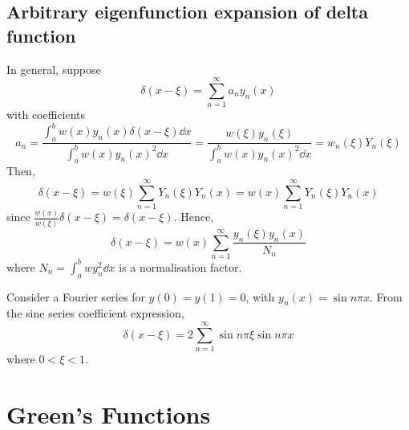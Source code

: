 \documentclass[a4paper]{article}
\begin{document}
\subsection{Arbitrary eigenfunction expansion of delta function}
In general, suppose
\[
	\delta(x-\xi) = \sum_{n=1}^\infty a_n y_n(x)
\]
with coefficients
\[
	a_n = \frac{\int_a^b w(x) y_n(x) \delta(x-\xi) \dd{x}}{\int_a^b w(x) y_n(x)^2 \dd{x}} = \frac{w(\xi) y_n(\xi)}{\int_a^b w(x) y_n(x)^2 \dd{x}} = w_n(\xi) Y_n(\xi)
\]
Then,
\[
	\delta(x-\xi) = w(\xi) \sum_{n=1}^\infty Y_n(\xi) Y_n(x) = w(x) \sum_{n=1}^\infty Y_n(\xi) Y_n(x)
\]
since \( \frac{w(x)}{w(\xi)} \delta(x - \xi) = \delta(x - \xi) \).
Hence,
\[
	\delta(x-\xi) = w(x) \sum_{n=1}^\infty \frac{y_n(\xi) y_n(x)}{N_n}
\]
where \( N_n = \int_a^b w y_n^2 \dd{x} \) is a normalisation factor.
\begin{example}
	Consider a Fourier series for \( y(0) = y(1) = 0 \), with \( y_n(x) = \sin n \pi x \).
	From the sine series coefficient expression,
	\[
		\delta(x-\xi) = 2\sum_{n=1}^\infty \sin n \pi \xi \sin n \pi x
	\]
	where \( 0 < \xi < 1 \).
\end{example}

\section{Green's Functions}
\end{document}
